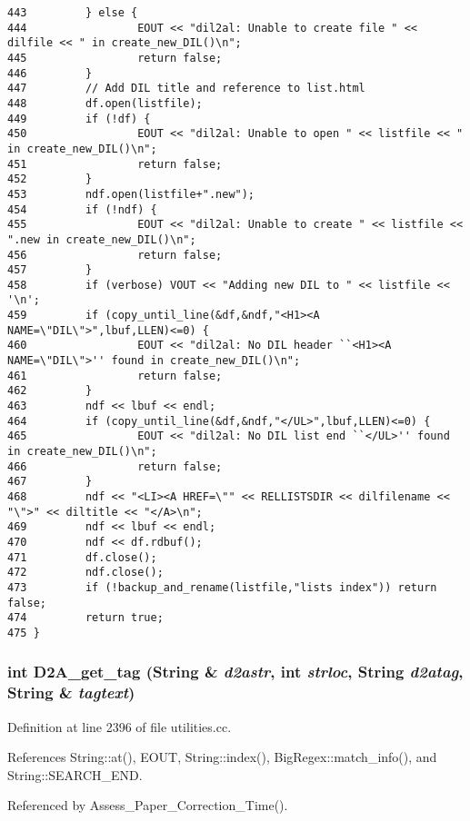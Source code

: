 \begin{verbatim}
443         } else {
444                 EOUT << "dil2al: Unable to create file " << dilfile << " in create_new_DIL()\n";
445                 return false;
446         }
447         // Add DIL title and reference to list.html
448         df.open(listfile);
449         if (!df) {
450                 EOUT << "dil2al: Unable to open " << listfile << " in create_new_DIL()\n";
451                 return false;
452         }
453         ndf.open(listfile+".new");
454         if (!ndf) {
455                 EOUT << "dil2al: Unable to create " << listfile << ".new in create_new_DIL()\n";
456                 return false;
457         }
458         if (verbose) VOUT << "Adding new DIL to " << listfile << '\n';
459         if (copy_until_line(&df,&ndf,"<H1><A NAME=\"DIL\">",lbuf,LLEN)<=0) {
460                 EOUT << "dil2al: No DIL header ``<H1><A NAME=\"DIL\">'' found in create_new_DIL()\n";
461                 return false;
462         }
463         ndf << lbuf << endl;
464         if (copy_until_line(&df,&ndf,"</UL>",lbuf,LLEN)<=0) {
465                 EOUT << "dil2al: No DIL list end ``</UL>'' found in create_new_DIL()\n";
466                 return false;
467         }
468         ndf << "<LI><A HREF=\"" << RELLISTSDIR << dilfilename << "\">" << diltitle << "</A>\n";
469         ndf << lbuf << endl;
470         ndf << df.rdbuf();
471         df.close();
472         ndf.close();
473         if (!backup_and_rename(listfile,"lists index")) return false;
474         return true;
475 }
\end{verbatim}\normalsize 
{}
\subsubsection{\setlength{\rightskip}{0pt plus 5cm}int D2A\_\-get\_\-tag ({\bf String} \& {\em d2astr}, int {\em strloc}, {\bf String} {\em d2atag}, {\bf String} \& {\em tagtext})}\label{dil2al_8hh_a249}




Definition at line 2396 of file utilities.cc.

References String::at(), EOUT, String::index(), Big\-Regex::match\_\-info(), and String::SEARCH\_\-END.

Referenced by Assess\_\-Paper\_\-Correction\_\-Time().



